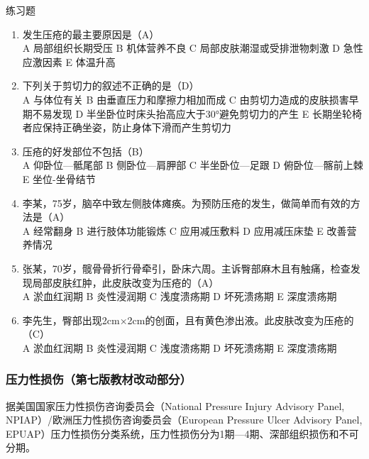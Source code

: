 \documentclass[11pt, a4paper]{ctexart}
\begin{document}
\begin{examplebox}{练习题}
\begin{enumerate}
    \item 发生压疮的最主要原因是（A）\\
    A 局部组织长期受压 \quad B 机体营养不良 \quad C 局部皮肤潮湿或受排泄物刺激 \quad D 急性应激因素 \quad E 体温升高
    \item 下列关于剪切力的叙述不正确的是（D）\\
    A 与体位有关 \quad B 由垂直压力和摩擦力相加而成 \quad C 由剪切力造成的皮肤损害早期不易发现 \quad D 半坐卧位时床头抬高应大于30°避免剪切力的产生 \quad E 长期坐轮椅者应保持正确坐姿，防止身体下滑而产生剪切力
    \item 压疮的好发部位不包括（B）\\
    A 仰卧位—骶尾部 \quad B 侧卧位—肩胛部 \quad C 半坐卧位—足跟 \quad D 俯卧位—髂前上棘 \quad E 坐位-坐骨结节
    \item 李某，75岁，脑卒中致左侧肢体瘫痪。为预防压疮的发生，做简单而有效的方法是（A）\\
    A 经常翻身 \quad B 进行肢体功能锻炼 \quad C 应用减压敷料 \quad D 应用减压床垫 \quad E 改善营养情况
    \item 张某，70岁，髋骨骨折行骨牵引，卧床六周。主诉臀部麻木且有触痛，检查发现局部皮肤红肿，此皮肤改变为压疮的（A）\\
    A 淤血红润期 \quad B 炎性浸润期 \quad C 浅度溃疡期 \quad D 坏死溃疡期 \quad E 深度溃疡期
    \item 李先生，臀部出现2cm×2cm的创面，且有黄色渗出液。此皮肤改变为压疮的（C）\\
    A 淤血红润期 \quad B 炎性浸润期 \quad C 浅度溃疡期 \quad D 坏死溃疡期 \quad E 深度溃疡期
\end{enumerate}
\end{examplebox}

\subsubsection{压力性损伤（第七版教材改动部分）}
据美国国家压力性损伤咨询委员会（National Pressure Injury Advisory Panel, NPIAP）/欧洲压力性损伤咨询委员会（European Pressure Ulcer Advisory Panel, EPUAP）压力性损伤分类系统，压力性损伤分为1期—4期、深部组织损伤和不可分期。
\end{document}
